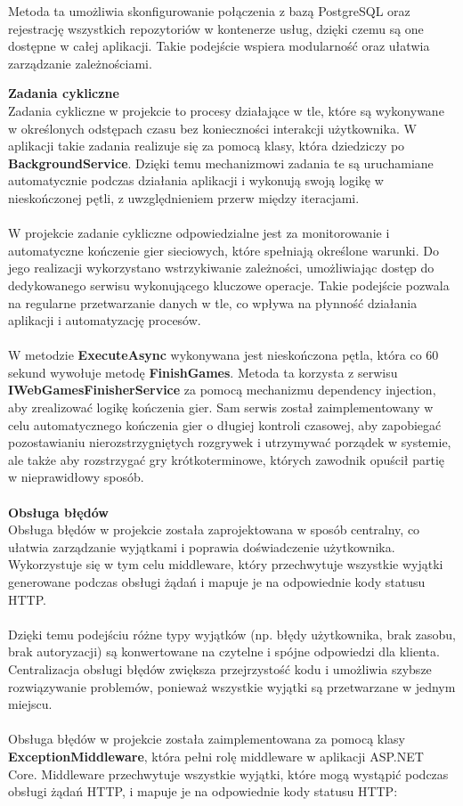 \documentclass[12pt,a4paper]{article}
\begin{document}
Metoda ta umożliwia skonfigurowanie połączenia z bazą PostgreSQL oraz rejestrację wszystkich repozytoriów w kontenerze usług, dzięki czemu są one dostępne w całej aplikacji. Takie podejście wspiera modularność oraz ułatwia zarządzanie zależnościami.

\newpage

\noindent \textbf{Zadania cykliczne}\\
Zadania cykliczne w projekcie to procesy działające w tle, które są wykonywane w określonych odstępach czasu bez konieczności interakcji użytkownika. W aplikacji takie zadania realizuje się za pomocą klasy, która dziedziczy po \textbf{BackgroundService}. Dzięki temu mechanizmowi zadania te są uruchamiane automatycznie podczas działania aplikacji i wykonują swoją logikę w nieskończonej pętli, z uwzględnieniem przerw między iteracjami.
\\\\
W projekcie zadanie cykliczne odpowiedzialne jest za monitorowanie i automatyczne kończenie gier sieciowych, które spełniają określone warunki. Do jego realizacji wykorzystano wstrzykiwanie zależności, umożliwiając dostęp do dedykowanego serwisu wykonującego kluczowe operacje. Takie podejście pozwala na regularne przetwarzanie danych w tle, co wpływa na płynność działania aplikacji i automatyzację procesów.
\\\\
W metodzie \textbf{ExecuteAsync} wykonywana jest nieskończona pętla, która co 60 sekund wywołuje metodę \textbf{FinishGames}. Metoda ta korzysta z serwisu \textbf{IWebGamesFinisherService} za pomocą mechanizmu dependency injection, aby zrealizować logikę kończenia gier. Sam serwis został zaimplementowany w celu automatycznego kończenia gier o długiej kontroli czasowej, aby zapobiegać pozostawianiu nierozstrzygniętych rozgrywek i utrzymywać porządek w systemie, ale także aby rozstrzygać gry krótkoterminowe, których zawodnik opuścił partię w nieprawidłowy sposób.
\\\\

\noindent \textbf{Obsługa błędów}\\
Obsługa błędów w projekcie została zaprojektowana w sposób centralny, co ułatwia zarządzanie wyjątkami i poprawia doświadczenie użytkownika. Wykorzystuje się w tym celu middleware, który przechwytuje wszystkie wyjątki generowane podczas obsługi żądań i mapuje je na odpowiednie kody statusu HTTP.
\\\\
Dzięki temu podejściu różne typy wyjątków (np. błędy użytkownika, brak zasobu, brak autoryzacji) są konwertowane na czytelne i spójne odpowiedzi dla klienta. Centralizacja obsługi błędów zwiększa przejrzystość kodu i umożliwia szybsze rozwiązywanie problemów, ponieważ wszystkie wyjątki są przetwarzane w jednym miejscu.
\\\\
Obsługa błędów w projekcie została zaimplementowana za pomocą klasy \textbf{ExceptionMiddleware}, która pełni rolę middleware w aplikacji ASP.NET Core. Middleware przechwytuje wszystkie wyjątki, które mogą wystąpić podczas obsługi żądań HTTP, i mapuje je na odpowiednie kody statusu HTTP:
\end{document}

